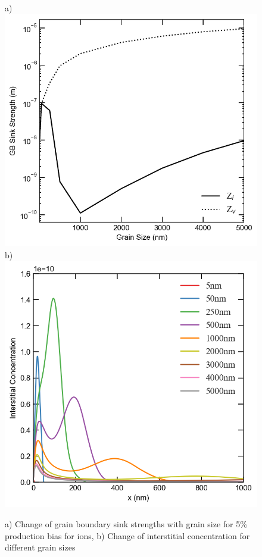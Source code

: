 \documentclass[utf8]{frontiersSCNS} %
\begin{document}
    \begin{figure}[h!]  %
        \centering
        a)\includegraphics[scale=0.55]{sink_strength_moose_ion_5_Z_scaled}
        b)\includegraphics[scale=0.55]{interstitial_concentration_5-5000nm-ion-5}
        \caption{a) Change of grain boundary sink strengths with grain size for 5\% production bias for ions, b) Change of interstitial concentration for different grain sizes}
        \label{figure:sink_strengths_ion_5_1e-3}
    \end{figure}
\end{document}
